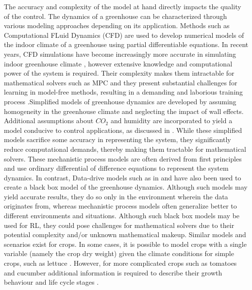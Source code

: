 The accuracy and complexity of the model at hand directly impacts the quality of the control.  The dynamics of a greenhouse can be characterized through various modeling approaches depending on its application. Methods such as Computational FLuid Dynamics (CFD) are used to develop numerical models of the indoor climate of a greenhouse using partial differentiable equations. In recent years, CFD simulations have become increasingly more accurate in simulating indoor greenhouse climate \cite{delatorre-geaComputationalFluidDynamics2011}, however extensive knowledge and computational power of the system is required.
Their complexity makes them intractable for mathematical solvers such as MPC and they present substantial challenges for learning in model-free methods, resulting in a demanding and laborious training process \cite{jansenOptimalControlLettuce2023}.Simplified models of greenhouse dynamics are developed by assuming homogeneity in the greenhouse climate and neglecting the impact of wall effects. Additional assumptions about $CO_2$ and humidity are incorporated to yield a model conducive to  control applications, as discussed in \cite{jansenOptimalControlLettuce2023, lopez-cruzDevelopmentAnalysisDynamical2018}. While these simplified models sacrifice some accuracy in representing the system, they significantly reduce computational demands, thereby making them tractable for mathematical solvers. These mechanistic process models are often derived from first principles and use ordinary differential of difference equations to represent the system dynamics.
In contrast, Data-drive models such as in \cite{gongDeepLearningBased2021} and \cite{maestriniMixingProcessbasedDatadriven2022} have also been used to create a black box model of the greenhouse dynamics. Although such models may yield accurate results, they do so only in the environment wherein the data originates from, whereas mechanistic process models often generalize better to different environments and situations. Although such black box models may be used for RL, they could pose challenges for mathematical solvers due to their potential complexity and/or unknown mathematical makeup.
Similar models and scenarios exist for crops. In some cases, it is possible to model crops with a single variable (namely the crop dry weight) given the climate conditions for simple crops, such as lettuce \cite{royPAPrecisionAgriculture2002}. However, for more complicated crops such as tomatoes and cucumber additional  information is required to describe their growth behaviour and life cycle stages \cite{kuijpersModelSelectionCommon2019}. 
